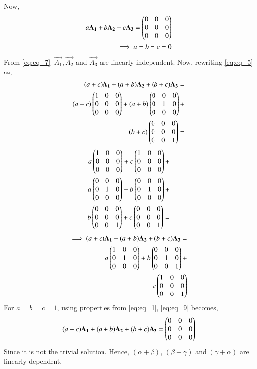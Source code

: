 \documentclass[journal,12pt,twocolumn]{IEEEtran}
\begin{document}
Now,
\begin{align}
    a\mathbf{A_1} + b\mathbf{A_2} + c\mathbf{A_3} = \begin{pmatrix}0 & 0 & 0 \\ 0 & 0 & 0 \\ 0 & 0 & 0\end{pmatrix} \label{eq:eq_7} \\
    \implies a = b = c = 0 \label{eq:eq_8}
\end{align}
From \eqref{eq:eq_7}, $\vec{A_1}, \vec{A_2}$ and $\vec{A_3}$ are linearly independent. Now, rewriting \eqref{eq:eq_5} as,
\begin{align}
    (a+c)\mathbf{A_1} + (a+b)\mathbf{A_2} + (b+c)\mathbf{A_3} = \nonumber \\
    (a+c)\begin{pmatrix}1 & 0 & 0 \\ 0 & 0 & 0 \\ 0 & 0 & 0\end{pmatrix} + 
    (a+b)\begin{pmatrix}0 & 0 & 0 \\ 0 & 1 & 0 \\ 0 & 0 & 0\end{pmatrix} + \nonumber \\
    (b+c)\begin{pmatrix}0 & 0 & 0 \\ 0 & 0 & 0 \\ 0 & 0 & 1\end{pmatrix} = \nonumber
\end{align}
\begin{align}
    a\begin{pmatrix}1 & 0 & 0 \\ 0 & 0 & 0 \\ 0 & 0 & 0\end{pmatrix} + 
    c\begin{pmatrix}1 & 0 & 0 \\ 0 & 0 & 0 \\ 0 & 0 & 0\end{pmatrix} + \nonumber \\
    a\begin{pmatrix}0 & 0 & 0 \\ 0 & 1 & 0 \\ 0 & 0 & 0\end{pmatrix} + 
    b\begin{pmatrix}0 & 0 & 0 \\ 0 & 1 & 0 \\ 0 & 0 & 0\end{pmatrix} + \nonumber \\
    b\begin{pmatrix}0 & 0 & 0 \\ 0 & 0 & 0 \\ 0 & 0 & 1\end{pmatrix} +
    c\begin{pmatrix}0 & 0 & 0 \\ 0 & 0 & 0 \\ 0 & 0 & 1\end{pmatrix} = \nonumber
\end{align}
\begin{align}
    \implies(a+c)\mathbf{A_1} + (a+b)\mathbf{A_2} + (b+c)\mathbf{A_3} = \nonumber \\ a\begin{pmatrix}1 & 0 & 0 \\ 0 & 1 & 0 \\ 0 & 0 & 0\end{pmatrix} + 
    b\begin{pmatrix}0 & 0 & 0 \\ 0 & 1 & 0 \\ 0 & 0 & 1\end{pmatrix} + \nonumber \\
    c\begin{pmatrix}1 & 0 & 0 \\ 0 & 0 & 0 \\ 0 & 0 & 1\end{pmatrix} \label{eq:eq_9}
\end{align}
For $a = b = c = 1$, using properties from \eqref{eq:eq_1},  \eqref{eq:eq_9} becomes,
\begin{align}
    (a+c)\mathbf{A_1} + (a+b)\mathbf{A_2} + (b+c)\mathbf{A_3} = \begin{pmatrix}0 & 0 & 0 \\ 0 & 0 & 0 \\ 0 & 0 & 0\end{pmatrix} \label{eq:eq_10}
\end{align}
Since it is not the trivial solution. Hence, $(\alpha + \beta)$, $(\beta + \gamma)$ and $(\gamma + \alpha)$ are linearly dependent.
\end{document}
